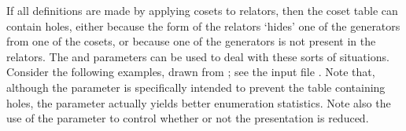 


If all definitions are made by applying cosets to relators, then the coset
  table can contain holes, either because the form of the relators `hides'
  one of the generators from one of the cosets, or because one of the
  generators is not present in the relators.
The  and  parameters can be used to deal with these
  sorts of situations.
Consider the following examples, drawn from \cite{War}; see the input file
  .
Note that, although the  parameter is specifically intended to
  prevent the table containing holes, the  parameter actually
  yields better enumeration statistics.
Note also the use of the  parameter to control whether or not
  the presentation is reduced.

